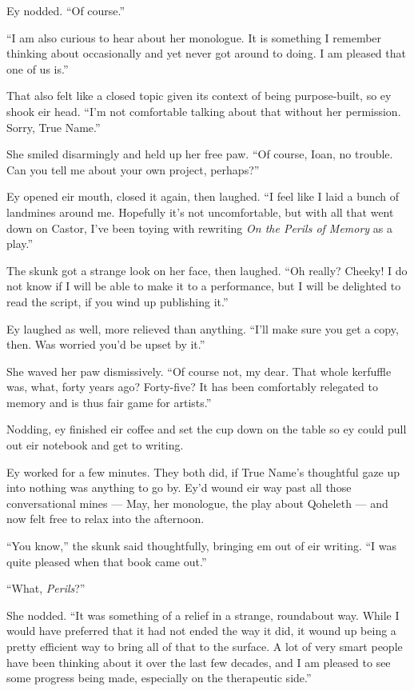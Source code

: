 Ey nodded. ``Of course.''

``I am also curious to hear about her monologue. It is something I remember thinking about occasionally and yet never got around to doing. I am pleased that one of us is.''

That also felt like a closed topic given its context of being purpose-built, so ey shook eir head. ``I'm not comfortable talking about that without her permission. Sorry, True Name.''

She smiled disarmingly and held up her free paw. ``Of course, Ioan, no trouble. Can you tell me about your own project, perhaps?''

Ey opened eir mouth, closed it again, then laughed. ``I feel like I laid a bunch of landmines around me. Hopefully it's not uncomfortable, but with all that went down on Castor, I've been toying with rewriting \emph{On the Perils of Memory} as a play.''

The skunk got a strange look on her face, then laughed. ``Oh really? Cheeky! I do not know if I will be able to make it to a performance, but I will be delighted to read the script, if you wind up publishing it.''

Ey laughed as well, more relieved than anything. ``I'll make sure you get a copy, then. Was worried you'd be upset by it.''

She waved her paw dismissively. ``Of course not, my dear. That whole kerfuffle was, what, forty years ago? Forty-five? It has been comfortably relegated to memory and is thus fair game for artists.''

Nodding, ey finished eir coffee and set the cup down on the table so ey could pull out eir notebook and get to writing.

Ey worked for a few minutes. They both did, if True Name's thoughtful gaze up into nothing was anything to go by. Ey'd wound eir way past all those conversational mines — May, her monologue, the play about Qoheleth — and now felt free to relax into the afternoon.

``You know,'' the skunk said thoughtfully, bringing em out of eir writing. ``I was quite pleased when that book came out.''

``What, \emph{Perils}?''

She nodded. ``It was something of a relief in a strange, roundabout way. While I would have preferred that it had not ended the way it did, it wound up being a pretty efficient way to bring all of that to the surface. A lot of very smart people have been thinking about it over the last few decades, and I am pleased to see some progress being made, especially on the therapeutic side.''

